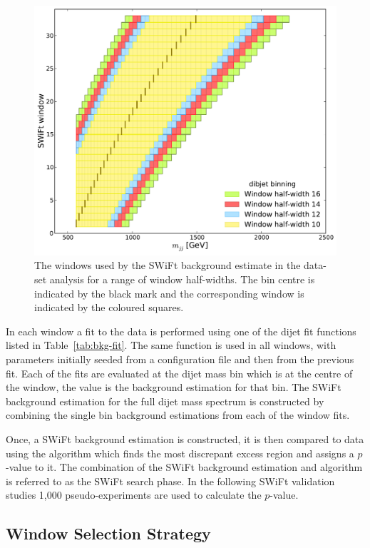 \begin{figure}[!htb]
\centering
\includegraphics[width=0.6\linewidth, angle=0]{figs/Dibjet/LowMass/evt-swiftBins_min566_fl0_fh0_tr0.pdf}
\vspace{-0.5em}
\caption[The windows used by the SWiFt background estimate in the \lm{} data-set analysis for a range of window half-widths.]
        {\label{fig:bkg-lm_swiftBins}
  The windows used by the SWiFt background estimate in the \lm{} data-set analysis for a range of window half-widths.
  The bin centre is indicated by the black mark and the corresponding window is indicated by the coloured squares.}
\end{figure}

In each window a fit to the data is performed using one of the dijet fit functions listed in Table~\ref{tab:bkg-fit}.
The same function is used in all windows, with parameters initially seeded from a configuration file and then from the previous fit.
Each of the fits are evaluated at the dijet mass bin which is at the centre of the window, the value is the background estimation for that bin.
The SWiFt background estimation for the full dijet mass spectrum is constructed by combining the single bin background estimations from each of the window fits.

Once, a SWiFt background estimation is constructed,
it is then compared to data using the \bh{} algorithm which finds the most discrepant excess region and assigns a \mbox{$p$-value} to it.
The combination of the SWiFt background estimation and \bh{} algorithm is referred to as the SWiFt search phase.
In the following SWiFt validation studies 1,000 pseudo-experiments are used to calculate the \bh{} \mbox{$p$-value}.

\subsection{Window Selection Strategy}
\label{sec:bkg-full_windowSel}

